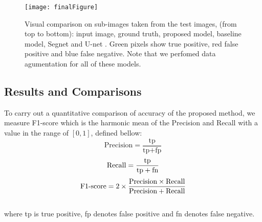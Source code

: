 \documentclass[10pt,twocolumn]{article}
\begin{document}
\begin{figure*}[h]
\centering
\texttt{[image: finalFigure]}
\caption{Visual comparison on sub-images taken from the test images, (from top to bottom): input image, ground truth, proposed model, baseline model, Segnet \cite{r8} and U-net \cite{r7}. Green pixels show true positive, red false positive and blue false negative. Note that we perfomed data agumentation for all of these models.
} \label{f5}
\end{figure*}

\subsection{Results and Comparisons}\label{s44}
To carry out a quantitative comparison of accuracy of the proposed method, we measure F1-score which is the harmonic mean of the Precision and Recall \cite{r20} with a value in the range of $[0,1]$, defined bellow:
\\
\begin{equation} 
 \text{Precision}=\frac{\text{tp}}{\text{tp}+\text{fp}}
\end{equation}
\begin{equation} 
 \textnormal{Recall}=\frac{\text{tp}}{\text{tp}+\text{fn}}
\end{equation}
\begin{equation} 
  \text{F1\text{-}score}=2\times\frac{\text{Precision}\times \textnormal{Recall}}{\text{Precision}+\textnormal{Recall}}
\end{equation}
\\
where tp is true positive, fp denotes false positive and fn denotes false negative. 
\end{document}
